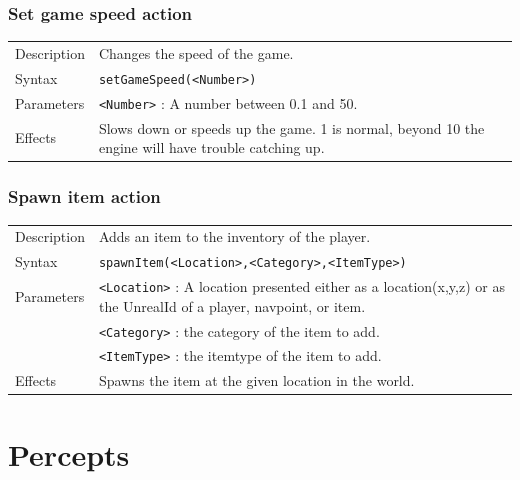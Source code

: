 \documentclass[11pt,a4paper]{article}
\begin{document}
\subsubsection*{Set game speed action}

\begin{small}
\begin{tabular}{p{2cm}p{9cm}}
Description & Changes the speed of the game. \\
Syntax & \verb|setGameSpeed(<Number>)|\\
Parameters 	& \verb|<Number>| : A number between 0.1 and 50. \\
Effects &	Slows down or speeds up the game. 1 is normal, beyond 10 the engine will have trouble catching up. \\
\end{tabular}
\end{small}

\subsubsection*{Spawn item action}

\begin{small}
\begin{tabular}{p{2cm}p{9cm}}
Description & Adds an item to the inventory of the player. \\
Syntax & \verb|spawnItem(<Location>,<Category>,<ItemType>)|\\
Parameters 	& \verb|<Location>| : A location presented either as a location(x,y,z) or as the UnrealId of a player, navpoint, or item. \\
		& \verb|<Category>| : the category of the item to add. \\
		& \verb|<ItemType>| : the itemtype of the item to add. \\
Effects &	Spawns the item at the given location in the world.\\
\end{tabular}
\end{small}

\section{Percepts}
\end{document}
